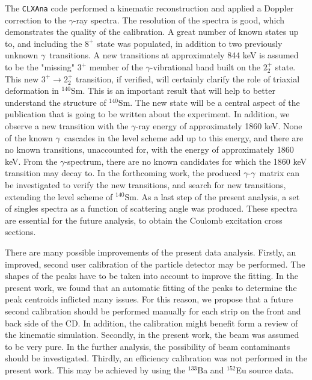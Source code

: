 \documentclass[twoside,english]{uiofysmaster/uiofysmaster}
\newcommand{\Sm}{$^{140}$Sm} %
\newcommand{\ga}{$\gamma$}
\begin{document}
The \texttt{CLXAna} code performed a kinematic reconstruction and applied a Doppler correction to the \ga-ray spectra.
The resolution of the spectra is good, which demonstrates the quality of the calibration.
A great number of known states up to, and including the $8^+$ state was populated, in addition to two previously unknown \ga\ transitions. 
A new transitions at approximately 844 keV is assumed to be the "missing" $3^+$ member of the \ga-vibrational band built on the $2_2^+$ state. 
This new $3^+ \rightarrow 2_2^+$ transition, if verified, will certainly clarify the role of triaxial deformation in \Sm.
This is an important result that will help to better understand the structure of \Sm. 
The new state will be a central aspect of the publication that is going to be written about the experiment.
In addition, we observe a new transition with the \ga-ray energy of approximately 1860 keV. 
None of the known \ga\ cascades in the level scheme add up to this energy, and there are no known transitions, unaccounted for, with the energy of approximately 1860 keV. 
From the \ga-spectrum, there are no known candidates for which the 1860 keV transition may decay to.
In the forthcoming work, the produced \ga-\ga\ matrix can be investigated to verify the new transitions, and search for new transitions, extending the level scheme of \Sm. 
As a last step of the present analysis, a set of singles spectra as a function of scattering angle was produced. These spectra are essential for the future analysis, to obtain the Coulomb excitation cross sections. 

There are many possible improvements of the present data analysis. 
Firstly, an improved, second user calibration of the particle detector may be performed. 
The shapes of the peaks have to be taken into account to improve the fitting. 
In the present work, we found that an automatic fitting of the peaks to determine the peak centroids inflicted many issues. 
For this reason, we propose that a future second calibration should be performed manually for each strip on the front and back side of the CD. 
In addition, the calibration might benefit form a review of the kinematic simulation.
Secondly, in the present work, the beam was assumed to be very pure. 
In the further analysis, the possibility of beam contaminants should be investigated.
Thirdly, an efficiency calibration was not performed in the present work. 
This may be achieved by using the $^{133}$Ba and $^{152}$Eu source data.
\end{document}

